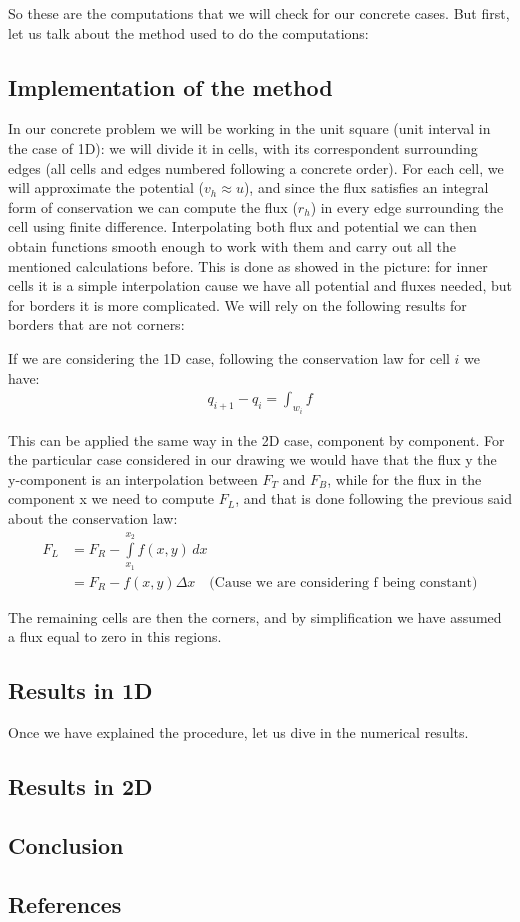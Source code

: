 \documentclass{article}
\begin{document}
	So these are the computations that we will check for our concrete cases. But first, let us talk about the method used to do the computations:
	\subsection*{Implementation of the method}
	In our concrete problem we will be working in the unit square (unit interval in the case of 1D): we will divide it in cells, with its correspondent surrounding edges (all cells and edges numbered following a concrete order). For each cell, we will approximate the potential ($v_h \approx u$), and since the flux satisfies an integral form of conservation we can compute the flux ($r_h$) in every edge surrounding the cell using finite difference. Interpolating both flux and potential we can then obtain functions smooth enough to work with them and carry out all the mentioned calculations before.
	This is done as showed in the picture: for inner cells it is a simple interpolation cause we have all potential and fluxes needed, but for borders it is more complicated. We will rely on the following results for borders that are not corners:
	
	If we are considering the 1D case, following the conservation law for cell $i$ we have:
	\begin{align*}
	q_{i+1} - q_i =  \int_{w_i} f
	\end{align*}
	
	This can be applied the same way in the 2D case, component by component. For the particular case considered in our drawing we would have that the flux y the y-component is an interpolation between $F_T$ and $F_B$, while for the flux in the component x we need to compute $F_L$, and that is done following the previous said about the conservation law:
	\begin{align*}
	F_L &= F_R - \int\limits_{x_1}^{x_2} f(x,y) \,dx\ \\
	&=  F_R - f(x,y)\Delta x \quad \text{(Cause we are considering f being constant)}
	\end{align*}
	
	The remaining cells are then the corners, and by simplification we have assumed a flux equal to zero in this regions.
	
	\subsection*{Results in 1D}
	Once we have explained the procedure, let us dive in the numerical results.
	
	\subsection*{Results in 2D}
	
	\subsection*{Conclusion}
	\subsection*{References}
\end{document}
